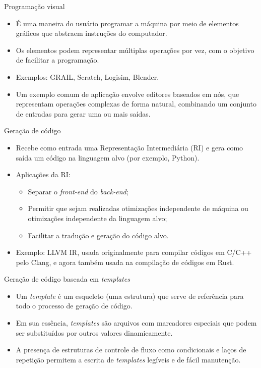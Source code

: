 \begin{frame}{Programação visual}
    \begin{itemize}
        \item É uma maneira do usuário programar a máquina por meio de elementos gráficos que abstraem instruções do computador.
        \item Os elementos podem representar múltiplas operações por vez, com o objetivo de facilitar a programação.
        \item Exemplos: GRAIL, Scratch, Logisim, Blender. 
        \item Um exemplo comum de aplicação envolve editores baseados em nós, que representam operações complexas de forma natural, combinando um conjunto de entradas para gerar uma ou mais saídas.
    \end{itemize}
\end{frame}

\begin{frame}{Geração de código}
    \begin{itemize}
        \item Recebe como entrada uma Representação Intermediária (RI) e gera como saída um código na linguagem alvo (por exemplo, Python).
        \item Aplicações da RI: 
        \begin{itemize}
            \item Separar o \textit{front-end} do \textit{back-end};
            \item Permitir que sejam realizadas otimizações independente de máquina ou otimizações independente da linguagem alvo; 
            \item Facilitar a tradução e geração do código alvo.
        \end{itemize}
        \item Exemplo: LLVM IR, usada originalmente para compilar códigos em C/C++ pelo Clang, e agora também usada na compilação de códigos em Rust.
    \end{itemize}    
\end{frame}

\begin{frame}{Geração de código baseada em \textit{templates}}
    \begin{itemize}
        \item Um \textit{template} é um esqueleto (uma estrutura) que serve de referência para todo o processo de geração de código.
        \item Em sua essência, \textit{templates} são arquivos com marcadores especiais que podem ser substituídos por outros valores dinamicamente.
        \item A presença de estruturas de controle de fluxo como condicionais e laços de repetição permitem a escrita de \textit{templates} legíveis e de fácil manutenção.
    \end{itemize}
\end{frame}

